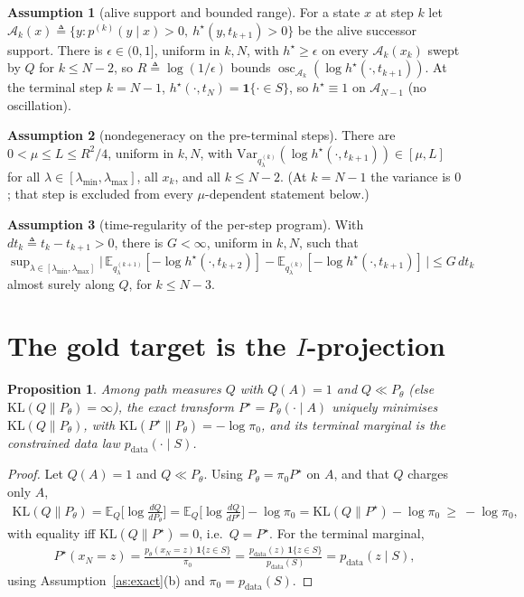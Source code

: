 \documentclass[11pt]{article}
\newcommand{\KL}{\mathrm{KL}}
\newcommand{\E}{\mathbb{E}}
\newcommand{\Var}{\mathrm{Var}}
\newcommand{\Aset}{\mathcal{A}}
\newcommand{\hs}{h^\star}
\DeclareMathOperator*{\osc}{osc}
\newcommand{\lmin}{\lambda_{\min}}
\newcommand{\lmax}{\lambda_{\max}}
\theoremstyle{plain}
\newtheorem{proposition}{Proposition}
\theoremstyle{definition}
\newtheorem{assumption}{Assumption}
\theoremstyle{remark}
\begin{document}
\begin{assumption}[alive support and bounded range]
\label{as:alive}
For a state $x$ at step $k$ let $\Aset_k(x)\triangleq\{y:p^{(k)}(y\mid x)>0,\ \hs(y,t_{k+1})>0\}$
be the alive successor support. There is $\epsilon\in(0,1]$, uniform in $k,N$, with
$\hs\ge\epsilon$ on every $\Aset_k(x_k)$ swept by $Q$ for $k\le N-2$, so
$R\triangleq\log(1/\epsilon)$ bounds $\osc_{\Aset_k}(\log\hs(\cdot,t_{k+1}))$. At the terminal step
$k=N-1$, $\hs(\cdot,t_N)=\mathbf 1\{\cdot\in S\}$, so $\hs\equiv1$ on $\Aset_{N-1}$ (no oscillation).
\end{assumption}

\begin{assumption}[nondegeneracy on the pre-terminal steps]
\label{as:mu}
There are $0<\mu\le L\le R^2/4$, uniform in $k,N$, with
$\Var_{q^{(k)}_\lambda}(\log\hs(\cdot,t_{k+1}))\in[\mu,L]$ for all $\lambda\in[\lmin,\lmax]$,
all $x_k$, and all $k\le N-2$. (At $k=N-1$ the variance is $0$; that step is
excluded from every $\mu$-dependent statement below.)
\end{assumption}

\begin{assumption}[time-regularity of the per-step program]
\label{as:drift}
With $dt_k\triangleq t_k-t_{k+1}>0$, there is $G<\infty$, uniform in $k,N$, such that
$\sup_{\lambda\in[\lmin,\lmax]}\big|\,\E_{q^{(k+1)}_\lambda}[-\log\hs(\cdot,t_{k+2})]
-\E_{q^{(k)}_\lambda}[-\log\hs(\cdot,t_{k+1})]\,\big|\le G\,dt_k$ almost surely along $Q$,
for $k\le N-3$.
\end{assumption}

\section{The gold target is the $I$-projection}
\label{sec:target}

\begin{proposition}
\label{prop:iproj}
Among path measures $Q$ with $Q(A)=1$ and $Q\ll P_\theta$ (else $\KL(Q\|P_\theta)=\infty$),
the exact transform $P^\star=P_\theta(\cdot\mid A)$ uniquely minimises $\KL(Q\|P_\theta)$,
with $\KL(P^\star\|P_\theta)=-\log\pi_0$, and its terminal marginal is the
constrained data law $p_{\text{data}}(\cdot\mid S)$.
\end{proposition}
\begin{proof}
Let $Q(A)=1$ and $Q\ll P_\theta$. Using $P_\theta=\pi_0P^\star$ on $A$, and that $Q$ charges only $A$,
\begin{gather*}
\KL(Q\|P_\theta)=\E_Q\!\Big[\log\tfrac{dQ}{dP_\theta}\Big]
=\E_Q\!\Big[\log\tfrac{dQ}{dP^\star}\Big]-\log\pi_0
=\KL(Q\|P^\star)-\log\pi_0\ \ge\ -\log\pi_0,
\end{gather*}
with equality iff $\KL(Q\|P^\star)=0$, i.e.\ $Q=P^\star$. For the terminal marginal,
\begin{gather*}
P^\star(x_N=z)=\frac{p_\theta(x_N=z)\,\mathbf 1\{z\in S\}}{\pi_0}
=\frac{p_{\text{data}}(z)\,\mathbf 1\{z\in S\}}{p_{\text{data}}(S)}=p_{\text{data}}(z\mid S),
\end{gather*}
using Assumption~\ref{as:exact}(b) and $\pi_0=p_{\text{data}}(S)$.
\end{proof}
\end{document}
